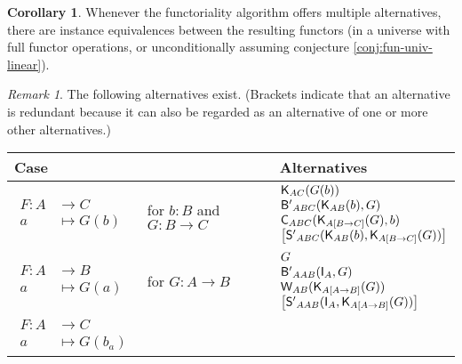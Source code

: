 \documentclass[a4paper]{article}
\theoremstyle{definition}
\newtheorem{corollary}[definition]{Corollary}
\theoremstyle{remark}
\newtheorem*{remark}{Remark}
\newcommand{\nm}{\mathsf}
\newcommand{\combinator}{\nm}
\newcommand{\idFun}{\combinator{I}}
\newcommand{\constFun}{\combinator{K}}
\newcommand{\compFun}{\combinator{B'}}
\newcommand{\swapFun}{\combinator{C}}
\newcommand{\dupFun}{\combinator{W}}
\newcommand{\substFun}{\combinator{S'}}
\begin{document}
\begin{corollary}
  Whenever the functoriality algorithm offers multiple alternatives, there are instance
  equivalences between the resulting functors (in a universe with full functor
  operations, or unconditionally assuming conjecture \ref{conj:fun-univ-linear}).
\end{corollary}

\begin{remark}
  The following alternatives exist. (Brackets indicate that an alternative is redundant
  because it can also be regarded as an alternative of one or more other alternatives.)

  \begin{longtable}{ll|l}
    Case & & Alternatives\\
    \hline\hline
    \rule{0pt}{3em}
    $\begin{aligned}
      F : A &\to     C\\
          a &\mapsto G(b)
    \end{aligned}$ &
    \parbox{3cm}{for $b : B$ \\ and $G : B \to C$} &
    $\begin{array}{@{}l@{}}
      \constFun_{AC}(G(b))\\
      \compFun_{ABC}(\constFun_{AB}(b),G)\\
      \swapFun_{ABC}(\constFun_{A[B{\to}C]}(G),b)\\
      \left[\substFun_{ABC}(\constFun_{AB}(b),\constFun_{A[B{\to}C]}(G))\right]
    \end{array}$\\
    \hline
    \rule{0pt}{3em}
    $\begin{aligned}
      F : A &\to     B\\
          a &\mapsto G(a)
    \end{aligned}$ &
    for $G : A \to B$ &
    $\begin{array}{@{}l@{}}
      G\\
      \compFun_{AAB}(\idFun_A,G)\\
      \dupFun_{AB}(\constFun_{A[A{\to}B]}(G))\\
      \left[\substFun_{AAB}(\idFun_A,\constFun_{A[A{\to}B]}(G))\right]
    \end{array}$\\
    \hline
    \rule{0pt}{2em}
    $\begin{aligned}
      F : A &\to     C\\
          a &\mapsto G(b_a)
    \end{aligned}$ &

\end{longtable}
\end{remark}
\end{document}
